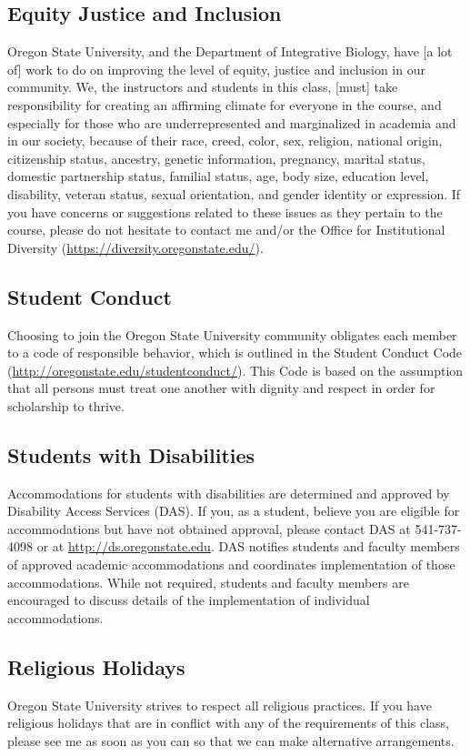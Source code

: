 \documentclass[10pt]{article}
\begin{document}
\subsection*{Equity Justice and Inclusion}
Oregon State University, and the Department of Integrative Biology, have [a lot of] work to do on 
improving the level of equity, justice and inclusion in our community. 
We, the instructors and students in this class, [must] take responsibility for creating an affirming climate 
for everyone in the course, and especially for those who are underrepresented and marginalized in 
academia and in our society, because of their race, creed, color, sex, religion, national origin, citizenship 
status, ancestry, genetic information, pregnancy, marital status, domestic partnership status, familial 
status, age, body size, education level, disability, veteran status, sexual orientation, and gender identity 
or expression. 
If you have concerns or suggestions related to these issues as they pertain to the course, please do not 
hesitate to contact me and/or the Office for Institutional Diversity 
(\href{https://diversity.oregonstate.edu/}{https://diversity.oregonstate.edu/}).

\subsection*{Student Conduct}
Choosing to join the Oregon State University community obligates each member to a code of responsible 
behavior, which is outlined in the Student Conduct Code  
(\href{http://oregonstate.edu/studentconduct/}{http://oregonstate.edu/studentconduct/}).
This Code is based on the assumption that all persons must treat one another with dignity and respect 
in order for scholarship to thrive.  

\subsection*{Students with Disabilities}
Accommodations for students with disabilities are determined and approved by Disability Access 
Services (DAS). 
If you, as a student, believe you are eligible for accommodations but have not obtained approval, please 
contact DAS at 541-737-4098 or at 
\href{http://ds.oregonstate.edu}{http://ds.oregonstate.edu}. 
DAS notifies students and faculty members of approved academic accommodations and coordinates 
implementation of those accommodations. 
While not required, students and faculty members are encouraged to discuss details of the 
implementation of individual accommodations.

\subsection*{Religious Holidays}
Oregon State University strives to respect all religious practices. 
If you have religious holidays that are in conflict with any of the requirements of this class, please see me 
as soon as you can so that we can make alternative arrangements.
\end{document}
